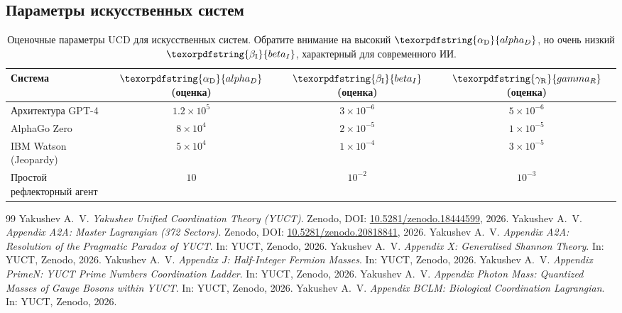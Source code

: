 \documentclass[12pt,a4paper]{article}
\DeclareRobustCommand{\alD}{\texorpdfstring{\ensuremath{\alpha_{\mathrm{D}}}}{alpha_D}}
\DeclareRobustCommand{\beI}{\texorpdfstring{\ensuremath{\beta_{\mathrm{I}}}}{beta_I}}
\DeclareRobustCommand{\gaR}{\texorpdfstring{\ensuremath{\gamma_{\mathrm{R}}}}{gamma_R}}
\begin{document}
	\subsection{Параметры искусственных систем}
	
	\begin{table}[ht]
		\centering
		\begin{tabular}{lccc}
			\toprule
			\textbf{Система} & \(\alD\) (оценка) & \(\beI\) (оценка) & \(\gaR\) (оценка) \\
			\midrule
			Архитектура GPT-4 & \(1.2 \times 10^5\) & \(3 \times 10^{-6}\) & \(5 \times 10^{-6}\) \\
			AlphaGo Zero & \(8 \times 10^4\) & \(2 \times 10^{-5}\) & \(1 \times 10^{-5}\) \\
			IBM Watson (Jeopardy) & \(5 \times 10^4\) & \(1 \times 10^{-4}\) & \(3 \times 10^{-5}\) \\
			Простой рефлекторный агент & \(10\) & \(10^{-2}\) & \(10^{-3}\) \\
			\bottomrule
		\end{tabular}
		\caption{Оценочные параметры UCD для искусственных систем. Обратите внимание на высокий \(\alD\), но очень низкий \(\beI\), характерный для современного ИИ.}
		\label{tab:ai-measurements}
	\end{table}
	
	\begin{thebibliography}{99}
		Yakushev A.~V. \emph{Yakushev Unified Coordination Theory (YUCT)}. Zenodo, DOI: \href{https://doi.org/10.5281/zenodo.18444599}{10.5281/zenodo.18444599}, 2026.
		Yakushev A.~V. \emph{Appendix A2A: Master Lagrangian (372 Sectors)}. Zenodo, DOI: \href{https://doi.org/10.5281/zenodo.20818841}{10.5281/zenodo.20818841}, 2026.
		Yakushev A.~V. \emph{Appendix A2A: Resolution of the Pragmatic Paradox of YUCT}. In: YUCT, Zenodo, 2026.
		Yakushev A.~V. \emph{Appendix X: Generalised Shannon Theory}. In: YUCT, Zenodo, 2026.
		Yakushev A.~V. \emph{Appendix J: Half-Integer Fermion Masses}. In: YUCT, Zenodo, 2026.
		Yakushev A.~V. \emph{Appendix PrimeN: YUCT Prime Numbers Coordination Ladder}. In: YUCT, Zenodo, 2026.
		Yakushev A.~V. \emph{Appendix Photon Mass: Quantized Masses of Gauge Bosons within YUCT}. In: YUCT, Zenodo, 2026.
		Yakushev A.~V. \emph{Appendix BCLM: Biological Coordination Lagrangian}. In: YUCT, Zenodo, 2026.
	\end{thebibliography}
	
\end{document}
